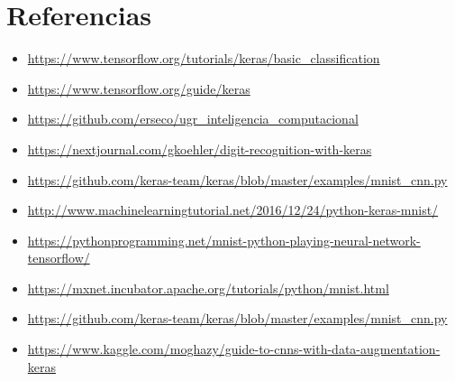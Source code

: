 \chapter{Referencias}
\label{chap:refer}

\begin{itemize}
  \item \url{https://www.tensorflow.org/tutorials/keras/basic_classification}
  \item \url{https://www.tensorflow.org/guide/keras}
  \item \url{https://github.com/erseco/ugr_inteligencia_computacional}
  \item \url{https://nextjournal.com/gkoehler/digit-recognition-with-keras}
  \item \url{https://github.com/keras-team/keras/blob/master/examples/mnist_cnn.py}
  \item \url{http://www.machinelearningtutorial.net/2016/12/24/python-keras-mnist/}
  \item \url{https://pythonprogramming.net/mnist-python-playing-neural-network-tensorflow/}
  \item \url{https://mxnet.incubator.apache.org/tutorials/python/mnist.html}
  \item \url{https://github.com/keras-team/keras/blob/master/examples/mnist_cnn.py}
  \item \url{https://www.kaggle.com/moghazy/guide-to-cnns-with-data-augmentation-keras}
\end{itemize}
